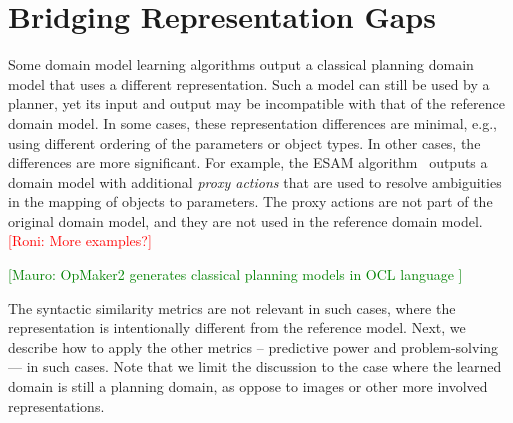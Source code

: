 \documentclass{article}
\theoremstyle{definition}
\theoremstyle{remark}
\newcommand{\roni}[1]{{\textcolor{red}{[Roni: #1]}}}
\newcommand{\mauro}[1]{{\textcolor{green}{[Mauro: #1]}}}
\begin{document}





\section{Bridging Representation Gaps}
\label{sec:bridging-gap}
Some domain model learning algorithms output a classical planning domain model that uses a different representation. Such a model can still be used by a planner, yet its input and output may be incompatible with that of the reference domain model. 
In some cases, these representation differences are minimal, e.g., using  different ordering of the parameters or object types. 
In other cases, the differences are more significant. 
For example, the ESAM algorithm~\citep{juba2021safe} outputs a domain model with additional \emph{proxy actions} that are used to resolve ambiguities in the mapping of objects to parameters.
The proxy actions are not part of the original domain model, and they are not used in the reference domain model. 
\roni{More examples?}

\mauro{OpMaker2 generates classical planning models in OCL language \cite{mccluskey2010action}}

The syntactic similarity metrics are not relevant in such cases, where the representation is intentionally different from the reference model. Next, we describe how to apply the other metrics -- predictive power and problem-solving --- in such cases. 
Note that we limit the discussion to the case where the learned domain is still a planning domain, as oppose to images or other more involved representations. 
\end{document}

